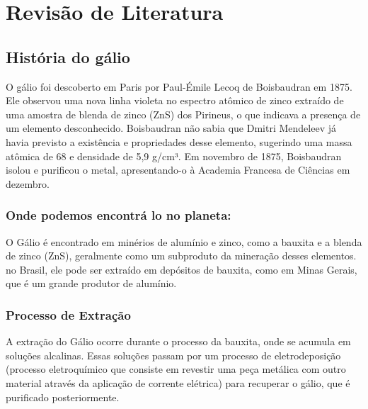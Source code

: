 \documentclass{article}
\begin{document}
\section{Revisão de Literatura}
\subsection{História do gálio}
O gálio foi descoberto em Paris por Paul-Émile Lecoq de Boisbaudran em 1875. Ele observou uma nova linha violeta no espectro atômico de zinco extraído de uma amostra de blenda de zinco (ZnS) dos Pirineus, o que indicava a presença de um elemento desconhecido.
Boisbaudran não sabia que Dmitri Mendeleev já havia previsto a existência e propriedades desse elemento, sugerindo uma massa atômica de 68 e densidade de 5,9 g/cm³. Em novembro de 1875, Boisbaudran isolou e purificou o metal, apresentando-o à Academia Francesa de Ciências em dezembro.
\subsubsection{Onde podemos encontrá lo no planeta:}
O Gálio é encontrado em minérios de alumínio e zinco, como a bauxita e a blenda de zinco (ZnS), geralmente como um subproduto da mineração desses elementos. no Brasil, ele pode ser extraído em depósitos de bauxita, como em Minas Gerais, que é um grande produtor de alumínio.
\subsubsection{Processo de Extração}
A extração do Gálio ocorre durante o processo da bauxita, onde se acumula em soluções alcalinas. Essas soluções passam por um processo de eletrodeposição (processo eletroquímico que consiste em revestir uma peça metálica com outro material através da aplicação de corrente elétrica) para recuperar o gálio, que é purificado posteriormente. 
\end{document}
